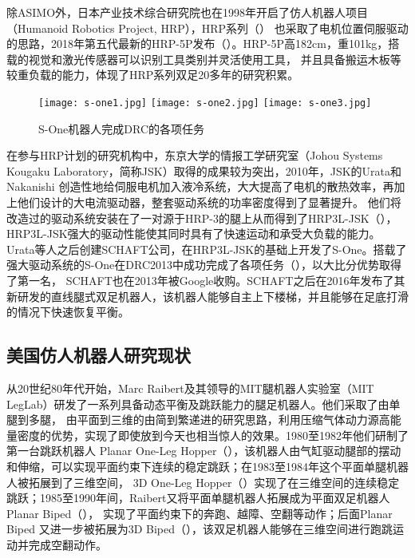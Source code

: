 除ASIMO外，日本产业技术综合研究院也在1998年开启了仿人机器人项目（Humanoid Robotics Project, HRP），HRP系列（）
也采取了电机位置伺服驱动的思路，2018年第五代最新的HRP-5P发布（）。HRP-5P高182cm，重101kg，搭载的视觉和激光传感器可以识别工具类别并灵活使用工具，
并且具备搬运木板等较重负载的能力\cite{HRP}，体现了HRP系列双足20多年的研究积累。

\begin{figure}[htbp]
    \centering
    \texttt{[image: s-one1.jpg]}
    \texttt{[image: s-one2.jpg]}
    \texttt{[image: s-one3.jpg]}
    \caption{\label{fig:s-one}S-One机器人完成DRC的各项任务}
\end{figure}

在参与HRP计划的研究机构中，东京大学的情报工学研究室（Johou Systems Kougaku Laboratory，简称JSK）取得的成果较为突出，2010年，JSK的Urata和Nakanishi
创造性地给伺服电机加入液冷系统，大大提高了电机的散热效率，再加上他们设计的大电流驱动器，整套驱动系统的功率密度得到了显著提升。
他们将改造过的驱动系统安装在了一对源于HRP-3的腿上从而得到了HRP3L-JSK（），HRP3L-JSK强大的驱动性能使其同时具有了快速运动和承受大负载的能力。
Urata等人之后创建SCHAFT公司，在HRP3L-JSK的基础上开发了S-One。搭载了强大驱动系统的S-One在DRC2013中成功完成了各项任务（），以大比分优势取得了第一名，
SCHAFT也在2013年被Google收购。SCHAFT之后在2016年发布了其新研发的直线腿式双足机器人，该机器人能够自主上下楼梯，并且能够在足底打滑的情况下快速恢复平衡\cite{SCHAFT}。

\subsection{美国仿人机器人研究现状}

从20世纪80年代开始，Marc Raibert及其领导的MIT腿机器人实验室（MIT LegLab）研发了一系列具备动态平衡及跳跃能力的腿足机器人。他们采取了由单腿到多腿，
由平面到三维的由简到繁递进的研究思路，利用压缩气体动力源高能量密度的优势，实现了即使放到今天也相当惊人的效果。1980至1982年他们研制了第一台跳跃机器人
Planar One-Leg Hopper（），该机器人由气缸驱动腿部的摆动和伸缩，可以实现平面约束下连续的稳定跳跃；在1983至1984年这个平面单腿机器人被拓展到了三维空间，
3D One-Leg Hopper（）实现了在三维空间的连续稳定跳跃；1985至1990年间，Raibert又将平面单腿机器人拓展成为平面双足机器人Planar Biped（），
实现了平面约束下的奔跑、越障、空翻等动作；后面Planar Biped 又进一步被拓展为3D Biped（），该双足机器人能够在三维空间进行跑跳运动并完成空翻动作\cite{raibert1986legged}。

